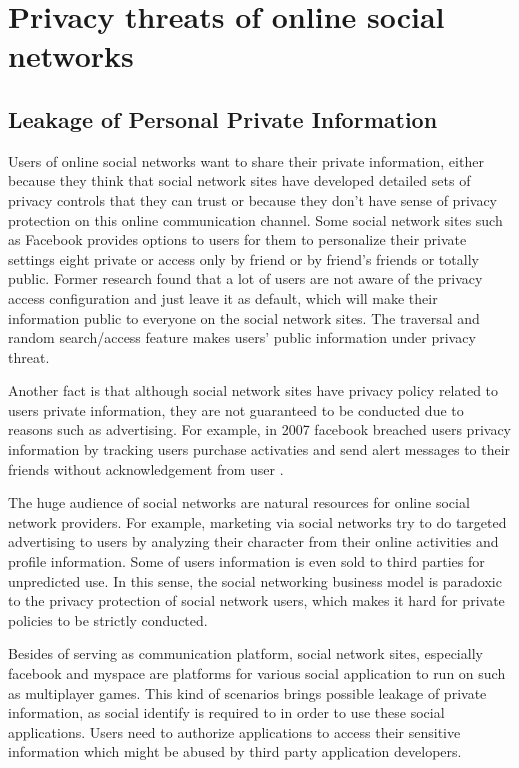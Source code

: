 \documentclass[12pt]{article}
\begin{document}
\section{Privacy threats of online social networks\label{sec:threats}}
\subsection{Leakage of Personal Private Information}
Users of online social networks want to share their private
information, either because they think that social network sites have
developed detailed sets of privacy controls that they can trust or
because they don't have sense of privacy protection on this online
communication channel. Some social network sites such as Facebook
provides options to users for them to personalize their private
settings eight private or access only by friend or by friend's friends
or totally public. Former research\cite{privacy-wizard} found that a lot of users
are not aware of the privacy access configuration and just leave it as
default, which will make their information public to everyone on the
social network sites. The traversal and random search/access feature
makes users' public information under privacy threat. 

Another fact is that although social network sites have privacy policy
related to users private information, they are not guaranteed to be
conducted due to reasons such as advertising. For example, in 2007
facebook breached users privacy information by tracking users purchase
activaties and send alert messages to their friends without
acknowledgement from user \cite{social-networking-report-economist}.


The huge audience of social networks are natural resources for online
social network providers. For example, marketing via social networks
try to do targeted advertising to users by analyzing their character
from their online activities and profile information. Some of users
information is even sold to third parties for unpredicted use.  In
this sense, the social networking business model is paradoxic to the
privacy protection of social network users, which makes it hard for
private policies to be strictly conducted.

Besides of serving as communication platform, social network sites,
especially facebook and myspace are platforms for various social
application to run on such as multiplayer games. This kind of
scenarios brings possible leakage of private information, as social
identify is required to in order to use these social
applications. Users need to authorize applications to access their
sensitive information which might be abused by third party application
developers.
\end{document}
